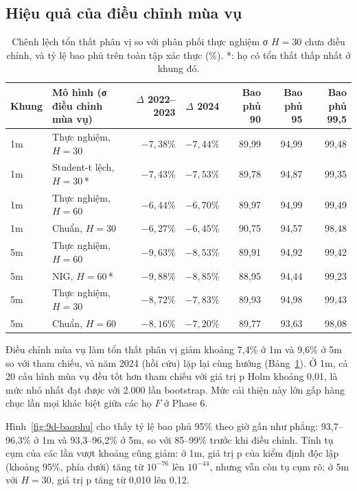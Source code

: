 \documentclass[11pt,a4paper]{article}
\begin{document}
\subsection{Hiệu quả của điều chỉnh mùa vụ}

\begin{table}[h]
\centering
\small
\caption{Chênh lệch tổn thất phân vị so với phân phối thực nghiệm σ $H=30$ chưa điều chỉnh, và tỷ lệ bao phủ trên toàn tập xác thực (\%). *: họ có tổn thất thấp nhất ở khung đó.}
\label{tab:9d-chinh}
\begin{tabular}{llrrrrr}
\toprule
Khung & Mô hình (σ điều chỉnh mùa vụ) & $\Delta$ 2022--2023 & $\Delta$ 2024 & Bao phủ 90 & Bao phủ 95 & Bao phủ 99,5 \\
\midrule
1m & Thực nghiệm, $H=30$ & $-7{,}38\%$ & $-7{,}44\%$ & 89,99 & 94,99 & 99,48 \\
1m & Student-t lệch, $H=30$\,* & $-7{,}43\%$ & $-7{,}53\%$ & 89,78 & 94,87 & 99,35 \\
1m & Thực nghiệm, $H=60$ & $-6{,}44\%$ & $-6{,}70\%$ & 89,97 & 94,99 & 99,49 \\
1m & Chuẩn, $H=30$ & $-6{,}27\%$ & $-6{,}45\%$ & 90,75 & 94,57 & 98,48 \\
\midrule
5m & Thực nghiệm, $H=60$ & $-9{,}63\%$ & $-8{,}53\%$ & 89,91 & 94,92 & 99,42 \\
5m & NIG, $H=60$\,* & $-9{,}88\%$ & $-8{,}85\%$ & 88,95 & 94,44 & 99,23 \\
5m & Thực nghiệm, $H=30$ & $-8{,}72\%$ & $-7{,}83\%$ & 89,93 & 94,98 & 99,43 \\
5m & Chuẩn, $H=60$ & $-8{,}16\%$ & $-7{,}20\%$ & 89,77 & 93,63 & 98,08 \\
\bottomrule
\end{tabular}
\end{table}

Điều chỉnh mùa vụ làm tổn thất phân vị giảm khoảng 7,4\% ở 1m và 9,6\% ở 5m so với tham chiếu, và năm 2024 (hồi cứu) lặp lại cùng hướng (Bảng~\ref{tab:9d-chinh}). Ở 1m, cả 20 cấu hình mùa vụ đều tốt hơn tham chiếu với giá trị p Holm khoảng 0,01, là mức nhỏ nhất đạt được với 2.000 lần bootstrap. Mức cải thiện này lớn gấp hàng chục lần mọi khác biệt giữa các họ $F$ ở Phase 6.

Hình~\ref{fig:9d-baophu} cho thấy tỷ lệ bao phủ 95\% theo giờ gần như phẳng: 93,7--96,3\% ở 1m và 93,3--96,2\% ở 5m, so với 85--99\% trước khi điều chỉnh. Tính tụ cụm của các lần vượt khoảng cũng giảm: ở 1m, giá trị p của kiểm định độc lập (khoảng 95\%, phía dưới) tăng từ $10^{-76}$ lên $10^{-44}$, nhưng vẫn còn tụ cụm rõ; ở 5m với $H=30$, giá trị p tăng từ 0,010 lên 0,12.
\end{document}
